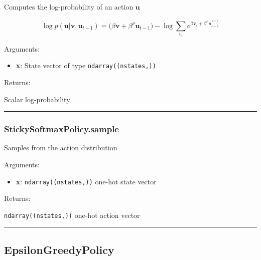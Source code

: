 Computes the log-probability of an action \(\mathbf u\)

\[
\log p(\mathbf u|\mathbf v, \mathbf u_{t-1}) = \big(\beta \mathbf v + \beta^\rho \mathbf u_{t-1}) - \log \sum_{v_i} e^{\beta \mathbf v_i + \beta^\rho u_{t-1}^{(i)}}
\]

Arguments:

\begin{itemize}
\tightlist
\item
  \textbf{x}: State vector of type \texttt{ndarray((nstates,))}
\end{itemize}

Returns:

Scalar log-probability

\begin{center}\rule{0.5\linewidth}{\linethickness}\end{center}

\hypertarget{stickysoftmaxpolicy.sample}{%
\subsubsection{StickySoftmaxPolicy.sample}\label{stickysoftmaxpolicy.sample}}

\begin{Shaded}
\begin{Highlighting}[]
\end{Highlighting}
\end{Shaded}

Samples from the action distribution

Arguments:

\begin{itemize}
\tightlist
\item
  \textbf{x}: \texttt{ndarray((nstates,))} one-hot state vector
\end{itemize}

Returns:

\texttt{ndarray((nstates,))} one-hot action vector

\begin{center}\rule{0.5\linewidth}{\linethickness}\end{center}

\hypertarget{epsilongreedypolicy}{%
\subsection{EpsilonGreedyPolicy}\label{epsilongreedypolicy}}

